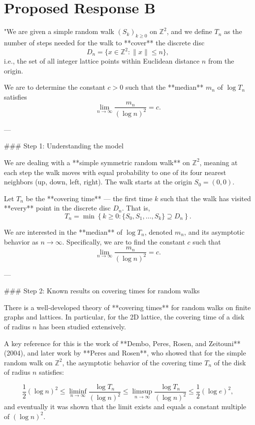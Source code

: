 \documentclass[11pt]{article}
\begin{document}
\section*{Proposed Response B}
"We are given a simple random walk $(S_k)_{k \geq 0}$ on $\mathbb{Z}^2$, and we define $T_n$ as the number of steps needed for the walk to **cover** the discrete disc  
$$
D_n = \{x \in \mathbb{Z}^2 : \|x\| \leq n\},
$$  
i.e., the set of all integer lattice points within Euclidean distance $n$ from the origin.

We are to determine the constant $c > 0$ such that the **median** $m_n$ of $\log T_n$ satisfies  
$$
\lim_{n \to \infty} \frac{m_n}{(\log n)^2} = c.
$$

---

### Step 1: Understanding the model

We are dealing with a **simple symmetric random walk** on $\mathbb{Z}^2$, meaning at each step the walk moves with equal probability to one of its four nearest neighbors (up, down, left, right). The walk starts at the origin $S_0 = (0,0)$.

Let $T_n$ be the **covering time** — the first time $k$ such that the walk has visited **every** point in the discrete disc $D_n$. That is,
$$
T_n = \min\left\{k \geq 0 : \{S_0, S_1, \dots, S_k\} \supseteq D_n \right\}.
$$

We are interested in the **median** of $\log T_n$, denoted $m_n$, and its asymptotic behavior as $n \to \infty$. Specifically, we are to find the constant $c$ such that
$$
\lim_{n \to \infty} \frac{m_n}{(\log n)^2} = c.
$$

---

### Step 2: Known results on covering times for random walks

There is a well-developed theory of **covering times** for random walks on finite graphs and lattices. In particular, for the 2D lattice, the covering time of a disk of radius $n$ has been studied extensively.

A key reference for this is the work of **Dembo, Peres, Rosen, and Zeitouni** (2004), and later work by **Peres and Rosen**, who showed that for the simple random walk on $\mathbb{Z}^2$, the asymptotic behavior of the covering time $T_n$ of the disk of radius $n$ satisfies:

$$
\frac{1}{2} (\log n)^2 \leq \liminf_{n \to \infty} \frac{\log T_n}{(\log n)^2} \leq \limsup_{n \to \infty} \frac{\log T_n}{(\log n)^2} \leq \frac{1}{2} (\log e)^2,
$$
and eventually it was shown that the limit exists and equals a constant multiple of $(\log n)^2$.
\end{document}
